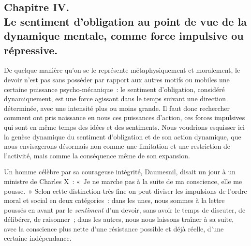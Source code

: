 \documentclass[french,twoside]{book} %
\begin{document}
\subsection[{Chapitre IV. Le sentiment d’obligation au point de vue de la dynamique mentale, comme force impulsive ou répressive.}]{Chapitre IV. \\
Le sentiment d’obligation au point de vue de la dynamique mentale, comme force impulsive ou répressive.}
\noindent De quelque manière qu’on se le représente métaphysiquement et moralement, le devoir n’est pas sans posséder par rapport aux autres motifs ou mobiles une certaine puissance psycho-mécanique : le sentiment d’obligation, considéré dynamiquement, est une force agissant dans le temps suivant une direction déterminée, avec une intensité plus ou moins grande. Il faut donc rechercher comment ont pris naissance en nous ces puissances d’action, ces forces impulsives qui sont en même temps des idées et des sentiments. Nous voudrions esquisser ici la genèse dynamique du sentiment d’obligation et de son action dynamique, que nous envisagerons désormais non comme une limitation et une restriction de l’activité, mais comme la conséquence même de son expansion.\par
Un homme célèbre par sa courageuse intégrité, Daumesnil, disait un jour à un ministre de Charles X : « Je ne marche pas à la suite de ma conscience, elle me pousse. » Selon cette distinction très fine on peut diviser les impulsions de l’ordre moral et social en deux catégories : dans les unes, nous sommes à la lettre poussés en avant par le \emph{sentiment} d’un devoir, sans avoir le temps de discuter, de délibérer, de raisonner ; dans les autres, nous nous laissons traîner à sa suite, avec la conscience plus nette d’une résistance possible et déjà réelle, d’une certaine indépendance.\par
\end{document}
